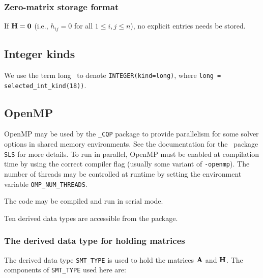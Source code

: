 \documentclass{galahad}
\newcommand{\packagename}{CQP}
\newcommand{\fullpackagename}{\libraryname\_\packagename}
\begin{document}
\subsubsection{Zero-matrix storage format}\label{zero}
If ${\mathbf{H}} = {\mathbf{0}}$ (i.e., $h_{ij} = 0$ for all $1 \leq i, j \leq n$),
no explicit entries needs be stored.


\subsection{Integer kinds}\label{Integer kinds}
We use the term
long \integer\ to denote {\tt INTEGER\-(kind=long)}, where
{\tt long = selected\_int\_kind(18))}.


\subsection{OpenMP}
OpenMP may be used by the {\tt \fullpackagename} package to provide
parallelism for some solver options in shared memory environments.
See the documentation for the \galahad\ package {\tt SLS} for more details.
To run in parallel, OpenMP
must be enabled at compilation time by using the correct compiler flag
(usually some variant of {\tt -openmp}).
The number of threads may be controlled at runtime
by setting the environment variable {\tt OMP\_NUM\_THREADS}.

\noindent
The code may be compiled and run in serial mode.


\galtypes
Ten derived data types are accessible from the package.


\subsubsection{The derived data type for holding matrices}\label{typesmt}
The derived data type {\tt SMT\_TYPE} is used to hold the matrices ${\mathbf{A}}$
and ${\mathbf{H}}$.
The components of {\tt SMT\_TYPE} used here are:
\end{document}
